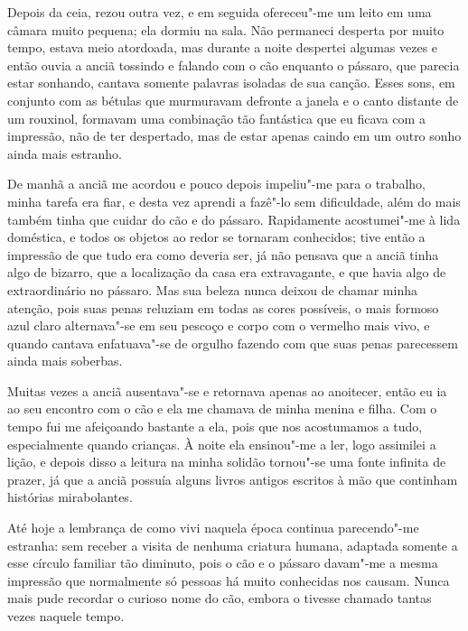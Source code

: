 Depois da ceia, rezou outra vez, e em seguida ofereceu"-me um leito em
uma câmara muito pequena; ela dormiu na sala. Não permaneci desperta
por muito tempo, estava meio atordoada, mas durante a noite despertei
algumas vezes e então ouvia a anciã tossindo e falando com o cão
enquanto o pássaro, que parecia estar sonhando, cantava somente
palavras isoladas de sua canção. Esses sons, em conjunto com as bétulas
que murmuravam defronte a janela e o canto distante de um rouxinol, 
formavam uma combinação tão fantástica que eu ficava com a
impressão, não de ter despertado, mas de estar apenas caindo em um
outro sonho ainda mais estranho.

 De manhã a anciã me acordou e pouco depois impeliu"-me para o trabalho,
minha tarefa era fiar, e desta vez aprendi a fazê"-lo sem dificuldade,
além do mais também tinha que cuidar do cão e do pássaro. Rapidamente
acostumei"-me à lida doméstica, e todos os objetos ao redor se tornaram
conhecidos; tive então a impressão de que tudo era como deveria ser, já
não pensava que a anciã tinha algo de bizarro, que a localização da
casa era extravagante, e que havia algo de extraordinário no pássaro.
Mas sua beleza nunca deixou de chamar minha atenção, pois suas penas
reluziam em todas as cores possíveis, o mais formoso azul claro
alternava"-se em seu pescoço e corpo com o vermelho mais vivo, e quando
cantava enfatuava"-se de orgulho fazendo com que suas penas parecessem
ainda mais soberbas.

 Muitas vezes a anciã ausentava"-se e retornava apenas ao anoitecer,
então eu ia ao seu encontro com o cão e ela me chamava de minha menina
e filha. Com o tempo fui me afeiçoando bastante a ela, pois que nos
acostumamos a tudo, especialmente quando crianças. À noite ela
\mbox{ensinou"-me} a ler, logo assimilei a lição, e depois disso a leitura na
minha solidão tornou"-se uma fonte infinita de prazer, já que a anciã
possuía alguns livros antigos escritos à mão que continham histórias
mirabolantes.

 Até hoje a lembrança de como vivi naquela época continua parecendo"-me
estranha: sem receber a visita de nenhuma criatura humana, adaptada
somente a esse círculo familiar tão diminuto, pois o cão e o pássaro
davam"-me a mesma impressão que normalmente só pessoas há muito
conhecidas nos causam. Nunca mais pude recordar o curioso nome do cão,
embora o tivesse chamado tantas vezes naquele tempo.

